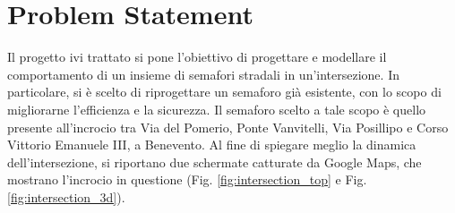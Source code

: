 \chapter*{Problem Statement}
\label{cap:problem-statement}

\rhead{\thepage}

Il progetto ivi trattato si pone l'obiettivo di progettare e modellare
il comportamento di un insieme di semafori stradali in un'intersezione.
In particolare, si è scelto di riprogettare un semaforo già esistente, 
con lo scopo di migliorarne l'efficienza e la sicurezza. Il semaforo 
scelto a tale scopo è quello presente all'incrocio tra Via del Pomerio, 
Ponte Vanvitelli, Via Posillipo e Corso Vittorio Emanuele III, a Benevento.
Al fine di spiegare meglio la dinamica dell'intersezione, si riportano due 
schermate catturate da Google Maps, che mostrano l'incrocio in questione 
(Fig. \ref{fig:intersection_top} e Fig. \ref{fig:intersection_3d}).

